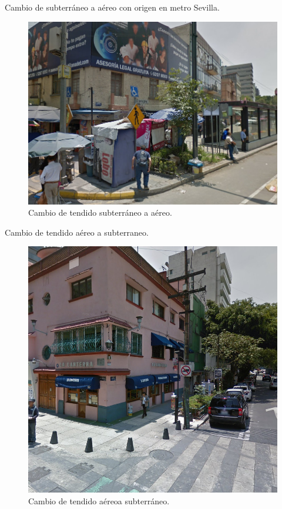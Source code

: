 \documentclass[12pt,letterpaper]{article}
\begin{document}
\newpage
Cambio de subterráneo a aéreo con origen en metro Sevilla.
\begin{figure}[ht]
    \centering
    \includegraphics[scale=.7]{imagenes/pc2.png}
    \caption{Cambio de tendido subterráneo a aéreo.}
\end{figure}

\newpage
Cambio de tendido aéreo a subterraneo.
\begin{figure}[ht]
    \centering
    \includegraphics[scale=.6]{imagenes/pc3.png}
    \caption{Cambio de tendido aéreoa subterráneo.}
\end{figure}
\end{document}
